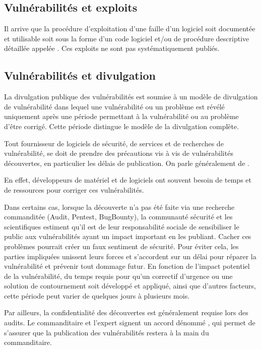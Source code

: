 \subsection{Vulnérabilités et exploits}

Il arrive que la procédure d'exploitation d'une faille d'un logiciel soit  documentée et utilisable soit sous la forme d'un code logiciel et/ou de procédure descriptive détaillée appelée . Ces exploits ne sont pas systématiquement publiés.

\subsection{Vulnérabilités et divulgation}

 La divulgation publique des vulnérabilités  est soumise à un modèle de divulgation de vulnérabilité dans lequel une vulnérabilité ou un problème est révélé uniquement après une période permettant à la vulnérabilité ou au problème d'être corrigé. Cette période distingue le modèle de la divulgation complète.
 
Tout fournisseur de logiciels de sécurité, de services et de recherches de vulnérabilité, se doit de prendre des précautions vis à vis de vulnérabilités découvertes, en particulier les délais de publication. On parle généralement de .

En effet, développeurs de matériel et de logiciels ont souvent besoin de temps et de ressources pour corriger ces vulnérabilités. 

Dans certains cas, lorsque la découverte n'a pas été faite via une recherche commanditée (Audit, Pentest, BugBounty), la communauté sécurité et les scientifiques  estiment qu’il est de leur responsabilité sociale de sensibiliser le public aux vulnérabilités ayant un impact important en les publiant. Cacher ces problèmes pourrait créer un faux sentiment de sécurité. Pour éviter cela, les parties impliquées unissent leurs forces et s’accordent sur un délai pour réparer la vulnérabilité et prévenir tout dommage futur. En fonction de l'impact potentiel de la vulnérabilité, du temps requis pour qu'un correctif d'urgence ou une solution de contournement soit développé et appliqué, ainsi que d'autres facteurs, cette période peut varier de quelques jours à plusieurs mois. 

Par ailleurs, la confidentialité des découvertes est généralement requise lors des audits. Le commanditaire et l'expert signent un accord dénommé , qui permet de s'assurer que la publication des vulnérabilités restera à la main du commanditaire.

